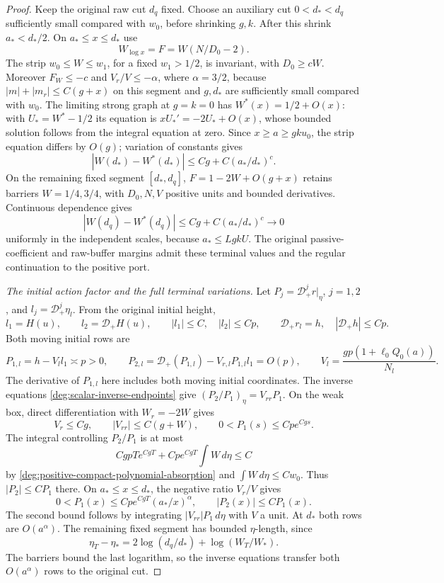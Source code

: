 \begin{proof}
Keep the original raw cut \(d_q\) fixed. Choose an auxiliary cut
\(0<d_*<d_q\) sufficiently small compared with \(w_0\), before
shrinking \(g,k\). After this shrink \(a_*<d_*/2\).
On \(a_*\le x\le d_*\) use
\[
 W_{\log x}=F=W(N/D_0-2).
\]
The strip \(w_0\le W\le w_1\), for a fixed \(w_1>1/2\), is
invariant, with \(D_0\ge cW\).
Moreover \(F_W\le-c\) and \(V_r/V\le-\alpha\), where
\(\alpha=3/2\), because
\(|m|+|m_r|\le C(g+x)\) on this segment and \(g,d_*\) are
sufficiently small compared with \(w_0\).
The limiting strong graph at \(g=k=0\) has
\(W^*(x)=1/2+O(x)\): with \(U_*=W^*-1/2\) its equation is
\(xU_*'=-2U_*+O(x)\), whose bounded solution follows from the
integral equation at zero.
Since \(x\ge a\ge gku_0\), the strip equation differs by \(O(g)\);
variation of constants gives
\[
 |W(d_*)-W^*(d_*)|\le Cg+C(a_*/d_*)^c.
\]
On the remaining fixed segment \([d_*,d_q]\),
\(F=1-2W+O(g+x)\) retains barriers \(W=1/4,3/4\), with
\(D_0,N,V\) positive units and bounded derivatives.
Continuous dependence gives
\begin{equation}
 |W(d_q)-W^*(d_q)|\le Cg+C(a_*/d_*)^c\longrightarrow0
 \label{deg:positive-compact-original-buffer}
\end{equation}
uniformly in the independent scales, because \(a_*\le LgkU\).
The original passive-coefficient and raw-buffer margins admit
these terminal values and the regular continuation to the positive port.

\smallskip
\noindent\emph{The initial action factor and the full terminal variations.}
Let \(P_j=\mathcal D_+^jr|_\eta\), \(j=1,2\), and
\(l_j=\mathcal D_+^j\eta_l\). From the original initial height,
\[
 l_1=H(u),\qquad l_2=\mathcal D_+H(u),\qquad
 |l_1|\le C,\quad |l_2|\le Cp,\qquad
 \mathcal D_+r_l=h,\quad |\mathcal D_+h|\le Cp.
\]
Both moving initial rows are
\begin{equation}
 P_{1,l}=h-V_ll_1\asymp p>0,\qquad
 P_{2,l}=\mathcal D_+(P_{1,l})-V_{r,l}P_{1,l}l_1=O(p),
 \qquad
 V_l=\frac{gp(1+\ell_0Q_0(a))}{N_l}.
 \label{deg:positive-compact-inverse-initial-rows}
\end{equation}
The derivative of \(P_{1,l}\) here includes both moving initial
coordinates. The inverse equations \eqref{deg:scalar-inverse-endpoints} give
\((P_2/P_1)_\eta=V_{rr}P_1\).
On the weak box, direct differentiation with \(W_r=-2W\) gives
\[
 V_r\le Cg,\qquad |V_{rr}|\le C(g+W),\qquad
 0<P_1(s)\le Cp e^{Cgs}.
\]
The integral controlling \(P_2/P_1\) is at most
\[
 CgpT e^{CgT}+Cp e^{CgT}\int W\,d\eta\le C
\]
by \eqref{deg:positive-compact-polynomial-absorption} and
\(\int W\,d\eta\le Cw_0\). Thus \(|P_2|\le CP_1\) there.
On \(a_*\le x\le d_*\), the negative ratio \(V_r/V\) gives
\begin{equation}
 0<P_1(x)\le Cp e^{CgT}(a_*/x)^\alpha,\qquad
 |P_2(x)|\le CP_1(x).
 \label{deg:positive-compact-inverse-decay}
\end{equation}
The second bound follows by integrating \(|V_{rr}|P_1\,d\eta\)
with \(V\) a unit. At \(d_*\) both rows are \(O(a^\alpha)\).
The remaining fixed segment has bounded \(\eta\)-length, since
\[
 \eta_T-\eta_*=2\log(d_q/d_*)+\log(W_T/W_*).
\]
The barriers bound the last logarithm, so the inverse equations
transfer both \(O(a^\alpha)\) rows to the original cut.


\end{proof}

